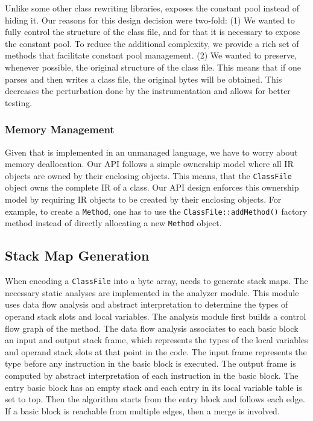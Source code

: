 Unlike some other class rewriting libraries, \jnif{} exposes the constant pool instead of hiding it.
Our reasons for this design decision were two-fold:
(1) We wanted to fully control the structure of the class file, 
and for that it is necessary to expose the constant pool. 
To reduce the additional complexity, we provide a rich set of methods that facilitate constant pool management. 
(2) We wanted to preserve, whenever possible, the original structure of the class file. 
This means that if one parses and then writes a class file, 
the original bytes will be obtained. 
This decreases the perturbation done by the instrumentation and allows for better testing.


\subsubsection*{Memory Management}

Given that \jnif{} is implemented in an unmanaged language,
we have to worry about memory deallocation.
Our API follows a simple ownership model
where all IR objects are owned by their enclosing objects.
This means, that the \texttt{ClassFile} object owns the complete IR of a class.
Our API design enforces this ownership model
by requiring IR objects to be created by their enclosing objects.
For example, to create a \texttt{Method}, 
one has to use the \texttt{ClassFile::addMethod()} factory method
instead of directly allocating a new \texttt{Method} object.


\subsection*{Stack Map Generation}

When encoding a \texttt{ClassFile} into a byte array, \jnif{} needs to generate stack maps.
The necessary static analyses are implemented in the analyzer module.
This module uses data flow analysis and abstract interpretation to determine the types of operand stack slots and local variables.
The analysis module first builds a control flow graph of the method.
The data flow analysis associates to each basic block an input and output stack frame, 
which represents the types of the local variables and operand stack slots at that point in the code.
The input frame represents the type before any instruction in the basic block is executed.
The output frame is computed by abstract interpretation of each instruction in the basic block.
The entry basic block has an empty stack and each entry in its local variable table is set to top.
Then the algorithm starts from the entry block and follows each edge.
If a basic block is reachable from multiple edges, then a merge is involved.

